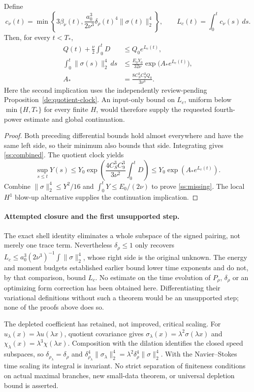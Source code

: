 \begin{corollary}
\label{ss:consumer}
Define
\[
 c_\nu(t)=\min\left\{3\beta_\nu(t),
    \frac{a_0^3}{2\nu^3}\delta_\rho(t)^4\|\sigma(t)\|_2^4\right\},
 \qquad L_c(t)=\int_0^t c_\nu(s)\,ds.
\]
Then, for every $t<T_*$,
\begin{align}
 Q(t)+\frac\nu2\int_0^tD&\le Q_0e^{L_c(t)},\label{ss:combined}\\
 \int_0^t\|\sigma(s)\|_2^4\,ds
 &\le\frac{E_0Y_0}{32\nu}
       \exp\!\bigl(A_*e^{L_c(t)}\bigr),\label{ss:missing}\\
 A_*&=\frac{8C_S^3C_9^3Q_0}{3\nu^3}.\nonumber
\end{align}
Here the second implication uses the independently review-pending
Proposition~\ref{de:quotient-clock}. An input-only bound on $L_c$,
uniform below $\min\{H,T_*\}$ for every finite $H$, would therefore
supply the requested fourth-power estimate and global continuation.
\end{corollary}
\begin{proof}
Both preceding differential bounds hold almost everywhere and have the
same left side, so their minimum also bounds that side. Integrating gives
\eqref{ss:combined}. The quotient clock yields
\[
 \sup_{s\le t}Y(s)\le Y_0
  \exp\left(\frac{4C_S^3C_9^3}{3\nu^2}\int_0^tD\right)
 \le Y_0\exp(A_*e^{L_c(t)}).
\]
Combine $\|\sigma\|_2^4\le Y^2/16$ and
$\int_0^tY\le E_0/(2\nu)$ to prove \eqref{ss:missing}.
The local $H^1$ blow-up alternative supplies the continuation implication.
\end{proof}

\paragraph{Attempted closure and the first unsupported step.}
The exact shell identity eliminates a whole subspace of the signed pairing,
not merely one trace term. Nevertheless $\delta_\rho\le1$ only recovers
$L_c\le a_0^3(2\nu^3)^{-1}\int\|\sigma\|_2^4$, whose right side is
the original unknown. The energy and moment budgets established earlier
bound lower time exponents and do not, by that comparison, bound $L_c$.
No estimate on the time evolution of $P_\rho$, $\delta_\rho$ or an
optimizing form correction has been obtained here. Differentiating their
variational definitions without such a theorem would be an unsupported
step; none of the proofs above does so.

The depleted coefficient has retained, not improved, critical scaling.
For $u_\lambda(x)=\lambda u(\lambda x)$, quotient covariance gives
$\sigma_\lambda(x)=\lambda^2\sigma(\lambda x)$ and
$\chi_\lambda(x)=\lambda^3\chi(\lambda x)$.
Composition with the dilation identifies the closed speed subspaces,
so $\delta_{\rho_\lambda}=\delta_\rho$ and
$\delta_{\rho_\lambda}^4\|\sigma_\lambda\|_2^4
=\lambda^2\delta_\rho^4\|\sigma\|_2^4$.
With the Navier--Stokes time scaling its integral is invariant.
No strict separation of finiteness conditions on actual maximal branches,
new small-data theorem, or universal depletion bound is asserted.

